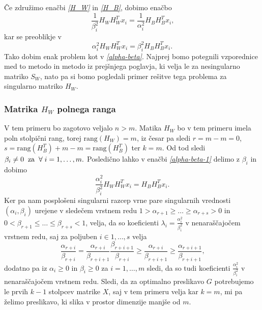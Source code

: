 \documentclass[mat1]{article}
\begin{document}

Če združimo enačbi \textit{\eqref{H_W}} in \textit{\eqref{H_B}}, dobimo enačbo
$$
\frac{1}{\beta_i^2} H_W H_W^T x_i = \frac{1}{\alpha_i^2} H_B H_B^T x_i
\text{,}
$$
kar se preoblikje v
\begin{equation} \label{alpha-beta-1}
\alpha_i^2 H_W H_W^T x_i = \beta_i^2 H_B H_B^T x_i
\text{.}
\end{equation}
Tako dobim enak problem kot v \textit{\eqref{alpha-beta}}.
Najprej bomo potegnili vzporednice med to metodo in metodo iz prejšnjega poglavja, ki velja le za nesingularno matriko $S_W$, nato pa si bomo pogledali primer rešitve tega problema za singularno matriko $H_W$.

\subsubsection{Matrika $H_W$ polnega ranga}
V tem primeru bo zagotovo veljalo $n > m$. Matika $H_W$ bo v tem primeru imela poln stolpični rang, torej $\text{rang}(H_W) = m$, iz česar pa sledi $r = m - m = 0$, $s = \text{rang}(H_B^T) + m - m = \text{rang}(H_B^T)$ ter $k = m$. Od tod sledi $\beta_i \neq 0 \hspace{2mm}  \text{za} \hspace{2mm}\forall \hspace{1mm} i = 1, \ldots, m \text{.}$ Posledično lahko v enačbi \textit{\eqref{alpha-beta-1}} delimo z $\beta_i$ in dobimo 
$$
\frac{\alpha_i^2}{\beta_i^2} H_W H_W^T x_i =  H_B H_B^T x_i
\text{.}
$$
Ker pa nam posplošeni singularni razcep vrne pare singularnih vrednosti $(\alpha_i, \beta_i)$ urejene v sledečem vrstnem redu $1 > \alpha_{r+1} \geq \ldots \geq \alpha_{r+s} > 0$ in $0 < \beta_{r+1} \leq \ldots \leq \beta_{r+s} < 1$, velja, da so koeficienti $\lambda_i = \frac{\alpha_i^2}{\beta_i^2}$ v nenaraščajočem vrstnem redu, saj za poljuben $i \in {1, \ldots, s}$ velja
$$
\frac{\alpha_{r+i}}{\beta_{r+i}} = 
\frac{\alpha_{r+i}}{\beta_{r+i+1}} \frac{\beta_{r+i + 1}}{\beta_{r+i}} 
\geq 
\frac{\alpha_{r+i}}{\beta_{r+i+1}}
\geq
\frac{\alpha_{r+i+1}}{\beta_{r+i+1}}
\text{,}
$$
dodatno pa iz $\alpha_i \geq 0$ in $\beta_i \geq 0$ za $i = 1, \ldots, m$ sledi, da so tudi koeficienti $\frac{\alpha_i^2}{\beta_i^2}$ v nenaraščajočem vrstnem redu. Sledi, da za optimalno preslikavo $G$ potrebujemo le prvih $k - 1$ stolpcev matrike $X$, saj v tem primeru velja kar $k = m$, mi pa želimo preslikavo, ki slika v prostor dimenzije manjše od $m$.
\end{document}
